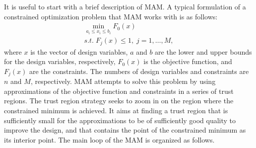 \documentclass[runningheads,a4paper]{llncs}
\begin{document}
It is useful to start with a brief description of MAM. A typical formulation of a constrained optimization problem that MAM works with is as follows:
\begin{equation}
  \label{eq:problem}
  \begin{array}{c}
  \min\limits_{a_i \le x_i \le b_i}F_0(x) \\
  s.t.\; F_j(x) \le 1,\; j=1,\dots ,M,
  \end{array}
\end{equation}
where $x$ is the vector of design variables, $a$ and $b$ are the lower and upper bounds for the design variables, respectively, $F_0(x)$ is the objective function, and $F_j(x)$ are the constraints. The numbers of design variables and constraints are $n$ and $M$, respectively. MAM attempts to solve this problem by using approximations of the objective function and constraints in a series of trust regions. The trust region strategy seeks to zoom in on the region where the constrained minimum is achieved. It aims at finding a trust region that is sufficiently small for the approximations to be of sufficiently good quality to improve the design, and that contains the point of the constrained minimum as its interior point. The main loop of the MAM is organized as follows.
\end{document}
